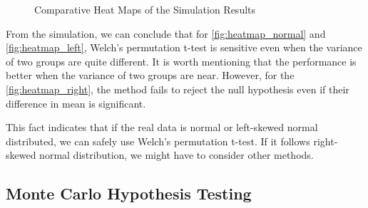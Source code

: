 \documentclass[12pt]{article}
\numberwithin{figure}{section}
\begin{document}
\begin{figure}[H]
    \centering
    \caption{Comparative Heat Maps of the Simulation Results}
    \label{fig:heatmaps}
\end{figure}

From the simulation, we can conclude that for \ref{fig:heatmap_normal} and \ref{fig:heatmap_left}, Welch’s permutation t-test is sensitive even when the variance of two groups are quite different. It is worth mentioning that the performance is better when the variance of two groups are near. However, for the \ref{fig:heatmap_right}, the method fails to reject the null hypothesis even if their difference in mean is significant.

This fact indicates that if the real data is normal or left-skewed normal distributed, we can safely use Welch’s permutation t-test. If it follows right-skewed normal distribution, we might have to consider other methods.


\subsection{Monte Carlo Hypothesis Testing}
\end{document}
